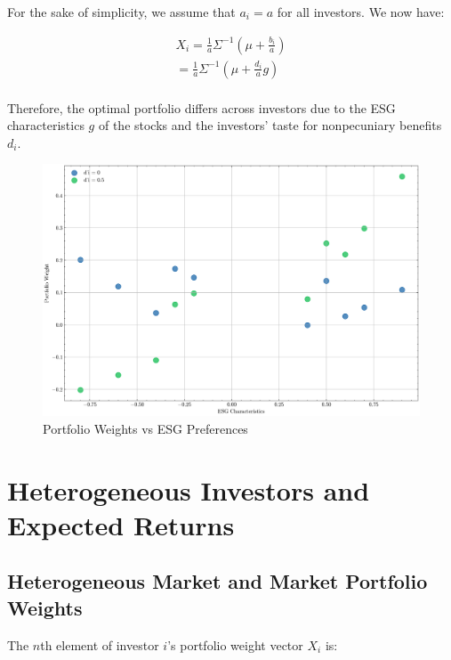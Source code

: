 For the sake of simplicity, we assume that $a_i = a$ for all investors.
We now have:

\begin{equation}
    \begin{aligned}
    X_i = \frac{1}{a} \Sigma^{-1}(\mu + \frac{b_i}{a}) \\
    = \frac{1}{a} \Sigma^{-1}(\mu + \frac{d_i}{a}g) \\
    \end{aligned}
\end{equation}

Therefore, the optimal portfolio differs across investors due to the
ESG characteristics $g$ of the stocks and the investors' taste for
nonpecuniary benefits $d_i$. 


\begin{figure}
    \centering
    \includegraphics[width=1\textwidth]{../images/chapter01/portfolio_weights_vs_esg.png}
    \caption{Portfolio Weights vs ESG Preferences}
    \label{fig:esg_taste}
\end{figure}

\newpage

\section{Heterogeneous Investors and Expected Returns}


\subsection{Heterogeneous Market and Market Portfolio Weights}

The $n$th element of investor $i$'s portfolio weight vector $X_i$ is:

